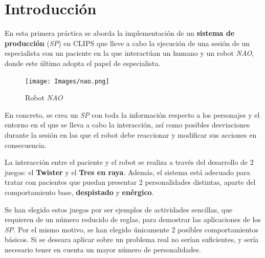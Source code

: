 \documentclass{uc3mpracticas}
\begin{document}
  \frontmatter



  \vspace{55mm}


  \newpage

  \tableofcontents

  \newpage

  \mainmatter

  \section{Introducción}

En esta primera práctica se aborda la implementación de un \textbf{sistema de producción} (\textit{SP}) en CLIPS que lleve a cabo la ejecución de una sesión de un especialista con un paciente en la que interactúan un humano y un robot \textit{NAO}, donde este último adopta el papel de especialista.

\begin{figure}[!h]
  \centering
  \texttt{[image: Images/nao.png]}
  \caption*{Robot \textit{NAO}}
\end{figure}


En concreto, se crea un \textit{SP} con toda la información respecto a los personajes y el entorno en el que se lleva a cabo la interacción, así como posibles desviaciones durante la sesión en las que el robot debe reaccionar y modificar sus acciones en consecuencia.

\vspace{2mm}

La interacción entre el paciente y el robot se realiza a través del desarrollo de 2 juegos: el \textbf{Twister} y el \textbf{Tres en raya}. Además, el sistema está adecuado para tratar con pacientes que puedan presentar 2 personalidades distintas, aparte del comportamiento base, \textbf{despistado} y \textbf{enérgico}.

\vspace{2mm}

Se han elegido estos juegos por ser ejemplos de actividades sencillas, que requieren de un número reducido de reglas, para demostrar las aplicaciones de los \textit{SP}. Por el mismo motivo, se han elegido únicamente 2 posibles comportamientos básicos. Si se deseara aplicar sobre un problema real no serían suficientes, y sería necesario tener en cuenta un mayor número de personalidades.
\end{document}
